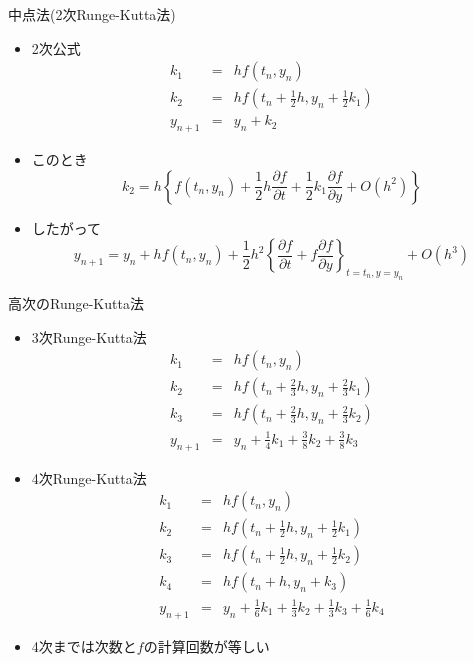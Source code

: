 \begin{frame}[t,fragile]{中点法(2次Runge-Kutta法)}
  \begin{itemize}
  \item 2次公式
    \[
    \begin{array}{rcl}
      k_1 & = & h f(t_n, y_n) \\
      k_2 & = & h f(t_n + \frac{1}{2}h, y_n + \frac{1}{2}k_1) \\
      y_{n+1} & = & y_n + k_2
    \end{array}
    \]
  \item このとき
    \[
    k_2 = h 
    \left\{
    f(t_n, y_n)
    + \frac{1}{2}h \frac{\partial f}{\partial t}
    + \frac{1}{2}k_1 \frac{\partial f}{\partial y}
    + O(h^2)
    \right\}
    \]
  \item したがって
    \[
    y_{n+1} = y_n + h f(t_n, y_n) + \frac{1}{2}h^2
    \left\{
    \frac{\partial f}{\partial t}
    + f \frac{\partial f}{\partial y}
    \right\}_{t=t_n, y=y_n}
    \!\!\!\!\!\!\!\!\!\!\!\!+ O(h^3)
    \]
  \end{itemize}
\end{frame}

\begin{frame}[t,fragile]{高次のRunge-Kutta法}
  \begin{itemize}
  \item 3次Runge-Kutta法
    \[
    \begin{array}{rcl}
      k_1 & = & h f(t_n, y_n) \\
      k_2 & = & h f(t_n + \frac{2}{3}h, y_n + \frac{2}{3}k_1) \\
      k_3 & = & h f(t_n + \frac{2}{3}h, y_n + \frac{2}{3}k_2) \\
      y_{n+1} & = & y_n + \frac{1}{4}k_1 + \frac{3}{8}k_2
      + \frac{3}{8}k_3
    \end{array}
    \]
  \item 4次Runge-Kutta法
    \[
    \begin{array}{rcl}
      k_1 & = & h f(t_n, y_n) \\
      k_2 & = & h f(t_n + \frac{1}{2}h, y_n + \frac{1}{2}k_1) \\
      k_3 & = & h f(t_n + \frac{1}{2}h, y_n + \frac{1}{2}k_2) \\
      k_4 & = & h f(t_n + h, y_n + k_3) \\
      y_{n+1} & = & y_n + \frac{1}{6}k_1 + \frac{1}{3}k_2
      + \frac{1}{3}k_3 + \frac{1}{6}k_4
    \end{array}
    \]
  \item 4次までは次数と$f$の計算回数が等しい
  \end{itemize}
\end{frame}

